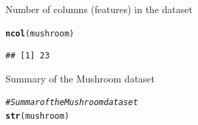 \documentclass[10pt  ,usenames, dvipsnames]{article}\usepackage[]{graphicx}\usepackage[]{color}
\makeatletter
\newcommand{\hlcom}[1]{\textcolor[rgb]{0.678,0.584,0.686}{\textit{#1}}}%
\newcommand{\hlstd}[1]{\textcolor[rgb]{0.345,0.345,0.345}{#1}}%
\newcommand{\hlkwd}[1]{\textcolor[rgb]{0.737,0.353,0.396}{\textbf{#1}}}%
\newenvironment{kframe}{%
 \def\at@end@of@kframe{}%
 \ifinner\ifhmode%
  \def\at@end@of@kframe{\end{minipage}}%
  \begin{minipage}{\columnwidth}%
 \fi\fi%
 \def\FrameCommand##1{\hskip\@totalleftmargin \hskip-\fboxsep
 \colorbox{shadecolor}{##1}\hskip-\fboxsep
     \hskip-\linewidth \hskip-\@totalleftmargin \hskip\columnwidth}%
 \MakeFramed {\advance\hsize-\width
   \@totalleftmargin\z@ \linewidth\hsize
   \@setminipage}}%
 {\par\unskip\endMakeFramed%
 \at@end@of@kframe}
\newenvironment{knitrout}{}{} %
\makeatother
\begin{document}
Number of columns (features) in the dataset

\begin{knitrout}
\color{fgcolor}\begin{kframe}
\begin{alltt}
\hlkwd{ncol}\hlstd{(mushroom)}
\end{alltt}
\end{kframe}
\end{knitrout}


\begin{knitrout}
\color{fgcolor}\begin{kframe}
\begin{verbatim}
## [1] 23
\end{verbatim}
\end{kframe}
\end{knitrout}

Summary of the Mushroom dataset

\begin{knitrout}
\color{fgcolor}\begin{kframe}
\begin{alltt}
\hlcom{#Summar of the Mushroom dataset}
\hlkwd{str}\hlstd{(mushroom)}
\end{alltt}
\end{kframe}
\end{knitrout}
\end{document}
